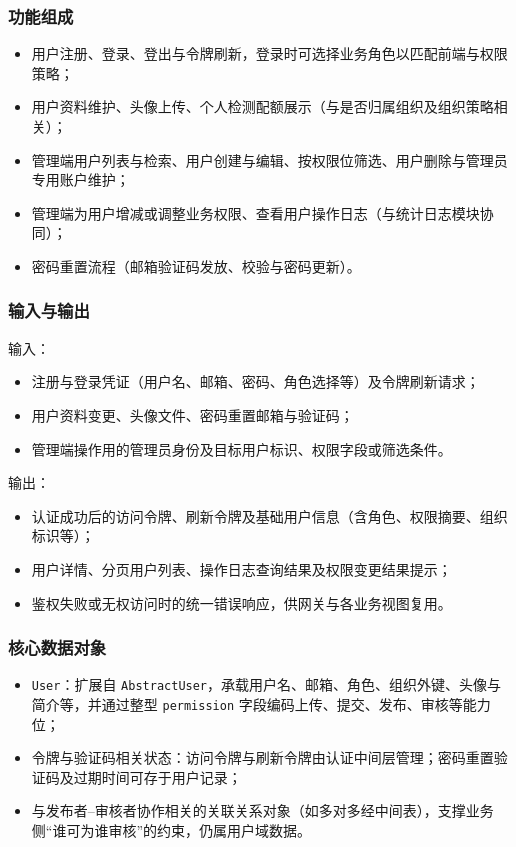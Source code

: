 \subsubsection{功能组成}
\begin{itemize}[leftmargin=2em]
    \item 用户注册、登录、登出与令牌刷新，登录时可选择业务角色以匹配前端与权限策略；
    \item 用户资料维护、头像上传、个人检测配额展示（与是否归属组织及组织策略相关）；
    \item 管理端用户列表与检索、用户创建与编辑、按权限位筛选、用户删除与管理员专用账户维护；
    \item 管理端为用户增减或调整业务权限、查看用户操作日志（与统计日志模块协同）；
    \item 密码重置流程（邮箱验证码发放、校验与密码更新）。
\end{itemize}

\subsubsection{输入与输出}
输入：
\begin{itemize}[leftmargin=2em]
    \item 注册与登录凭证（用户名、邮箱、密码、角色选择等）及令牌刷新请求；
    \item 用户资料变更、头像文件、密码重置邮箱与验证码；
    \item 管理端操作用的管理员身份及目标用户标识、权限字段或筛选条件。
\end{itemize}

输出：
\begin{itemize}[leftmargin=2em]
    \item 认证成功后的访问令牌、刷新令牌及基础用户信息（含角色、权限摘要、组织标识等）；
    \item 用户详情、分页用户列表、操作日志查询结果及权限变更结果提示；
    \item 鉴权失败或无权访问时的统一错误响应，供网关与各业务视图复用。
\end{itemize}

\subsubsection{核心数据对象}
\begin{itemize}[leftmargin=2em]
    \item \texttt{User}：扩展自 \texttt{AbstractUser}，承载用户名、邮箱、角色、组织外键、头像与简介等，并通过整型 \texttt{permission} 字段编码上传、提交、发布、审核等能力位；
    \item 令牌与验证码相关状态：访问令牌与刷新令牌由认证中间层管理；密码重置验证码及过期时间可存于用户记录；
    \item 与发布者--审核者协作相关的关联关系对象（如多对多经中间表），支撑业务侧“谁可为谁审核”的约束，仍属用户域数据。
\end{itemize}

